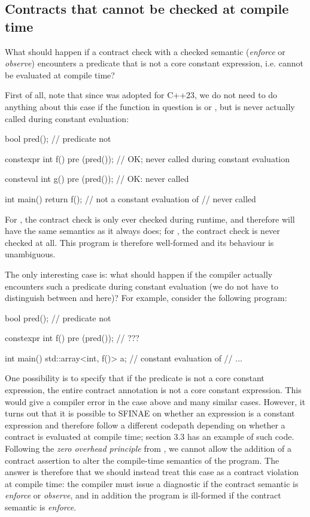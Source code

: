 \subsection{Contracts that cannot be checked at compile time}
\label{subsec:noncore}

What should happen if a contract check with a checked semantic (\emph{enforce} or \emph{observe}) encounters a predicate that is not a core constant expression, i.e. cannot be evaluated at compile time?

First of all, note that since \cite{P2448R2} was adopted for C++23, we do not need to do anything about this case if the function in question is  or , but is never actually called during constant evaluation:

\begin{codeblock}
bool pred();  // predicate not 

constexpr int f() 
  pre (pred());  // OK; never called during constant evaluation
  
consteval int g() 
  pre (pred());  // OK: never called

int main() {
  return f();  // not a constant evaluation of 
  //  never called
}
\end{codeblock}

For , the contract check is only ever checked during runtime, and therefore will have the same semantics as it always does; for , the contract check is never checked at all. This program is therefore well-formed and its behaviour is unambiguous.

The only interesting case is: what should happen if the compiler actually encounters such a predicate during constant evaluation (we do not have to distinguish between  and  here)? For example, consider the following program:

\begin{codeblock}
bool pred();  // predicate not 

constexpr int f() 
  pre (pred());  // ???

int main() {
  std::array<int, f()> a;  // constant evaluation of 
  // ...
}
\end{codeblock}

One possibility is to specify that if the predicate is not a core constant expression, the entire contract annotation is not a core constant expression. This would give a compiler error in the case above and many similar cases. However, it turns out that it is possible to SFINAE on whether an expression is a constant expression and therefore follow a different codepath depending on whether a contract is evaluated at compile time; \cite{P2932R2} section 3.3 has an example of such code. Following the \emph{zero overhead principle} from \cite{P2932R2}, we cannot allow the addition of a contract assertion to alter the compile-time semantics of the program. The answer is therefore that we should instead treat this case as a contract violation at compile time: the compiler must issue a diagnostic if the contract semantic is \emph{enforce} or \emph{observe}, and in addition the program is ill-formed if the contract semantic is \emph{enforce}.

